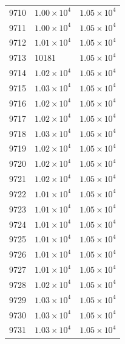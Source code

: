 \begin{table}[H]
\begin{tabular}{lll}
9710 & $\displaystyle 1.00 \times 10^{4}$ & $\displaystyle 1.05 \times 10^{4}$ \\
9711 & $\displaystyle 1.00 \times 10^{4}$ & $\displaystyle 1.05 \times 10^{4}$ \\
9712 & $\displaystyle 1.01 \times 10^{4}$ & $\displaystyle 1.05 \times 10^{4}$ \\
9713 & 10181 & $\displaystyle 1.05 \times 10^{4}$ \\
9714 & $\displaystyle 1.02 \times 10^{4}$ & $\displaystyle 1.05 \times 10^{4}$ \\
9715 & $\displaystyle 1.03 \times 10^{4}$ & $\displaystyle 1.05 \times 10^{4}$ \\
9716 & $\displaystyle 1.02 \times 10^{4}$ & $\displaystyle 1.05 \times 10^{4}$ \\
9717 & $\displaystyle 1.02 \times 10^{4}$ & $\displaystyle 1.05 \times 10^{4}$ \\
9718 & $\displaystyle 1.03 \times 10^{4}$ & $\displaystyle 1.05 \times 10^{4}$ \\
9719 & $\displaystyle 1.02 \times 10^{4}$ & $\displaystyle 1.05 \times 10^{4}$ \\
9720 & $\displaystyle 1.02 \times 10^{4}$ & $\displaystyle 1.05 \times 10^{4}$ \\
9721 & $\displaystyle 1.02 \times 10^{4}$ & $\displaystyle 1.05 \times 10^{4}$ \\
9722 & $\displaystyle 1.01 \times 10^{4}$ & $\displaystyle 1.05 \times 10^{4}$ \\
9723 & $\displaystyle 1.01 \times 10^{4}$ & $\displaystyle 1.05 \times 10^{4}$ \\
9724 & $\displaystyle 1.01 \times 10^{4}$ & $\displaystyle 1.05 \times 10^{4}$ \\
9725 & $\displaystyle 1.01 \times 10^{4}$ & $\displaystyle 1.05 \times 10^{4}$ \\
9726 & $\displaystyle 1.01 \times 10^{4}$ & $\displaystyle 1.05 \times 10^{4}$ \\
9727 & $\displaystyle 1.01 \times 10^{4}$ & $\displaystyle 1.05 \times 10^{4}$ \\
9728 & $\displaystyle 1.02 \times 10^{4}$ & $\displaystyle 1.05 \times 10^{4}$ \\
9729 & $\displaystyle 1.03 \times 10^{4}$ & $\displaystyle 1.05 \times 10^{4}$ \\
9730 & $\displaystyle 1.03 \times 10^{4}$ & $\displaystyle 1.05 \times 10^{4}$ \\
9731 & $\displaystyle 1.03 \times 10^{4}$ & $\displaystyle 1.05 \times 10^{4}$ \\

\end{tabular}
\end{table}
